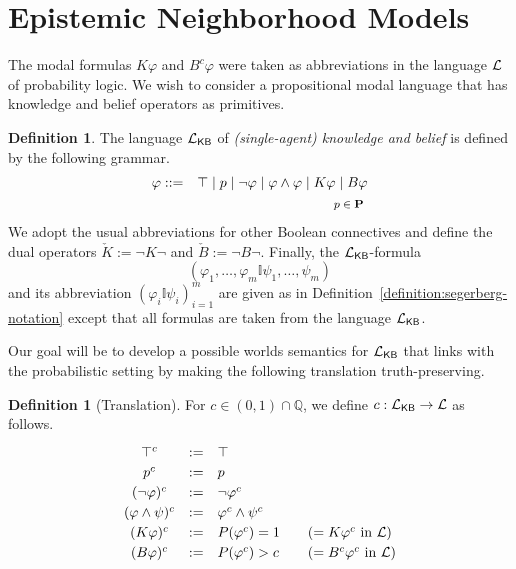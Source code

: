 \documentclass[12pt]{article}
\theoremstyle{definition}
\newtheorem{definition}[theorem]{Definition}
\newcommand{\Rat}{\mathbb{Q}}  %
\newcommand{\Prop}{{\bf P}}    %
\newcommand{\Lang}{{\cal L}}   %
\newcommand{\KB}{{\mathsf{KB}}}                 %
\begin{document}
\section{Epistemic Neighborhood Models}
\label{Section:ENM}

The modal formulas $K\varphi$ and $B^c\varphi$ were taken as abbreviations
in the language $\Lang$ of probability logic.  We wish to consider a
propositional modal language that has knowledge and belief operators
as primitives.

\begin{definition}
  The language $\Lang_\KB$ of \emph{(single-agent) knowledge and
    belief} is defined by the following grammar.
  \begin{eqnarray*}
    \varphi & ::= & 
    \top \mid p \mid \neg\varphi \mid \varphi\land\varphi \mid
    K\varphi \mid B\varphi
    \\
    &&
    \text{\footnotesize 
      $p\in\Prop$
    }
  \end{eqnarray*}
  We adopt the usual abbreviations for other Boolean connectives and
  define the dual operators $\check K:=\lnot K\lnot$ and
  $\check B:=\lnot B\lnot$.  Finally, the $\Lang_\KB$-formula
  \[
  (\varphi_1,\dots,\varphi_m\mathbb{I}\psi_1,\dots,\psi_m)
  \]
  and its abbreviation $(\varphi_i\mathbb{I}\psi_i)_{i=1}^m$ are given as
  in Definition~\ref{definition:segerberg-notation} except that all
  formulas are taken from the language $\Lang_\KB$.
\end{definition}

Our goal will be to develop a possible worlds semantics for
$\Lang_\KB$ that links with the probabilistic setting by making the
following translation truth-preserving.

\begin{definition}[Translation]
  \label{definition:translation}
  For $c\in(0,1)\cap\Rat$, we define $c: \Lang_\KB \to \Lang$ as
  follows.
  \[
  \renewcommand{\arraystretch}{1.2}
  \begin{array}{ccl@{\qquad}l}
    \top^c & := & \top
    \\
    p^c & := & p 
    \\
    (\neg \varphi)^c & := & \neg \varphi^c 
    \\
    (\varphi \land \psi)^c & := & \varphi^c \land \psi^c 
    \\
    (K\varphi)^c & := & P(\varphi^c) = 1
    & (= K\varphi^c \text{ in } \Lang)
    \\
    (B\varphi)^c & := & \textstyle P(\varphi^c) > c
    & (= B^c\varphi^c \text{ in } \Lang)
  \end{array}
  \]
\end{definition} 
\end{document}
